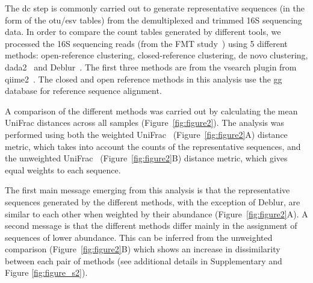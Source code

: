   The \ac{dc} step is commonly carried out to generate representative sequences (in the form of the \acs{otu}/\acs{esv} tables) from the demultiplexed and trimmed 16S sequencing data.
  In order to compare the count tables generated by different tools, we processed the 16S sequencing reads (from the FMT study~\cite{Kang2017}) using 5 different methods: open-reference clustering, closed-reference clustering, de novo clustering, \ac{dada2}~\cite{Callahan2016} and Deblur~\cite{Amir2017}.
  The first three methods are from the vsearch plugin from \ac{qiime2}~\cite{bolyenReproducibleInteractiveScalable2019}.
  The closed and open reference methods in this analysis use the \acl{gg}~\cite{DeSantis2006} database for reference sequence alignment.

  A comparison of the different methods was carried out by calculating the mean UniFrac distances across all samples (Figure~\ref{fig:figure2}).
  The analysis was performed using both the weighted UniFrac~\cite{Lozupone2007} (Figure~\ref{fig:figure2}A) distance metric, which takes into account the counts of the representative sequences, and the unweighted UniFrac~\cite{Lozupone2005} (Figure~\ref{fig:figure2}B) distance metric, which gives equal weights to each sequence.

  The first main message emerging from this analysis is that the representative sequences generated by the different methods, with the exception of Deblur, are similar to each other when weighted by their abundance (Figure~\ref{fig:figure2}A).
  A second message is that the different methods differ mainly in the assignment of sequences of lower abundance.
  This can be inferred from the unweighted comparison (Figure~\ref{fig:figure2}B) which shows an increase in dissimilarity between each pair of methods (see additional details in Supplementary and Figure \ref{fig:figure_s2}).


